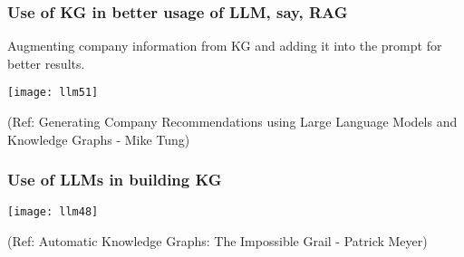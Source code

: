 \begin{frame}[fragile]\frametitle{Use of KG in better usage of LLM, say, RAG}

Augmenting company information from KG and adding it into the prompt for better results.

\begin{center}
\texttt{[image: llm51]}
\end{center}	

{\tiny (Ref: Generating Company Recommendations using Large Language Models and Knowledge Graphs - Mike Tung)}

\end{frame}

\begin{frame}[fragile]\frametitle{Use of LLMs in building KG}

\begin{center}
\texttt{[image: llm48]}
\end{center}

{\tiny (Ref: Automatic Knowledge Graphs: The Impossible Grail - Patrick Meyer)}

\end{frame}

